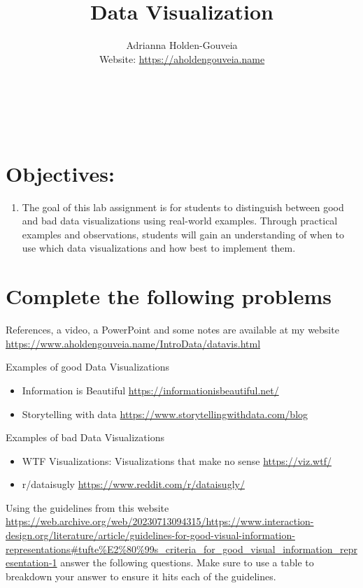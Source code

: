 \documentclass[12pt]{article}
\title{Data Visualization}
\author{
        Adrianna Holden-Gouveia \\
        Website: \url{https://aholdengouveia.name}\\ 
        \date{\vspace{-5ex}}
        \faLinkedin{: aholdengouveia} \\
        \faGithub {: aholdengouveia} \\
        \faTwitter {: aholdengouveia} \\
        }
\begin{document}
    

\maketitle


\section*{Objectives:}
\begin{enumerate}
    \item The goal of this lab assignment is for students to distinguish between good and bad data visualizations using real-world examples. Through practical examples and observations, students will gain an understanding of when to use which data visualizations and how best to implement them.
\end{enumerate}
\section*{Complete the following problems}

References, a video, a PowerPoint and some notes are available at my website
\url {https://www.aholdengouveia.name/IntroData/datavis.html}

Examples of good Data Visualizations
\begin{itemize}
    \item Information is Beautiful \url{https://informationisbeautiful.net/}
    \item Storytelling with data \url{https://www.storytellingwithdata.com/blog}
\end{itemize}    

Examples of bad Data Visualizations
\begin{itemize}
    \item WTF Visualizations: Visualizations that make no sense \url{https://viz.wtf/}
    \item r/dataisugly \url{https://www.reddit.com/r/dataisugly/}
\end{itemize}

Using the guidelines from this website \url{https://web.archive.org/web/20230713094315/https://www.interaction-design.org/literature/article/guidelines-for-good-visual-information-representations#tufte%E2%80%99s_criteria_for_good_visual_information_representation-1} answer the following questions.  Make sure to use a table to breakdown your answer to ensure it hits each of the guidelines.
\end{document}
